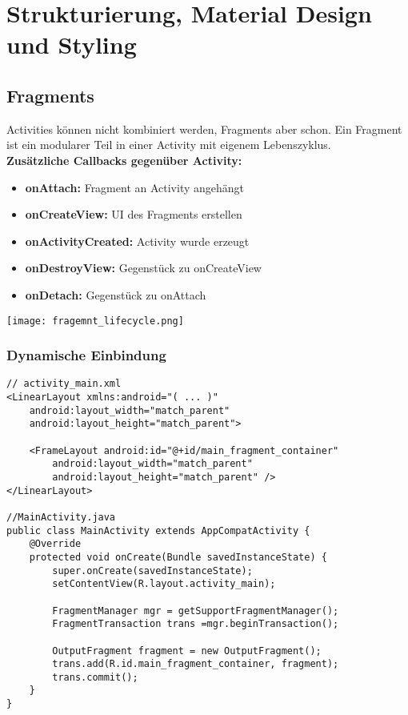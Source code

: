 
\section{Strukturierung, Material Design und Styling}
\subsection{Fragments}
Activities können nicht kombiniert werden, Fragments aber schon. Ein Fragment ist ein modularer Teil in einer Activity mit eigenem Lebenszyklus.\\
\textbf{Zusätzliche Callbacks gegenüber Activity:}
\begin{itemize}[topsep=0pt, leftmargin=4mm]
    \setlength\itemsep{-0.3em}
    \item \textbf{onAttach:} Fragment an Activity angehängt 
    \item \textbf{onCreateView:} UI des Fragments erstellen 
    \item \textbf{onActivityCreated:} Activity wurde erzeugt 
    \item \textbf{onDestroyView:} Gegenstück zu onCreateView 
    \item \textbf{onDetach:} Gegenstück zu onAttach
\end{itemize}
\begin{center}
    \texttt{[image: fragemnt\_lifecycle.png]}
\end{center}
\subsubsection{Dynamische Einbindung}
\begin{lstlisting}
// activity_main.xml
<LinearLayout xmlns:android="( ... )"
    android:layout_width="match_parent"
    android:layout_height="match_parent">

    <FrameLayout android:id="@+id/main_fragment_container"
        android:layout_width="match_parent"
        android:layout_height="match_parent" />
</LinearLayout>

//MainActivity.java
public class MainActivity extends AppCompatActivity {
    @Override
    protected void onCreate(Bundle savedInstanceState) {
        super.onCreate(savedInstanceState);
        setContentView(R.layout.activity_main);

        FragmentManager mgr = getSupportFragmentManager();
        FragmentTransaction trans =mgr.beginTransaction();

        OutputFragment fragment = new OutputFragment();
        trans.add(R.id.main_fragment_container, fragment);
        trans.commit();
    }
}
\end{lstlisting}
